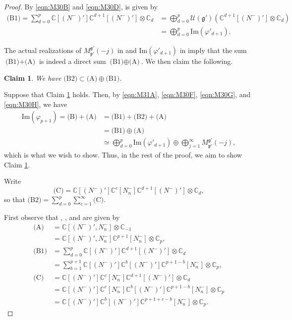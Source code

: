 \documentclass[10pt,a4paper]{amsart}
\newtheorem{claim}{Claim}
\newcommand{\C}{\mathbb{C}}
\newcommand{\Cal}{\mathcal}
\renewcommand{\Im}{\mathrm{Im}}
\newcommand{\Mpp}{M^{\fg'}_{\fp'}}
\newcommand{\Nn}{N_n^-}
\newcommand{\Np}{(N^-)'}
\newcommand{\fg}{{\mathfrak g}}
\newcommand{\fp}{{\mathfrak p}}
\begin{document}
\begin{proof}
\noindent
By \eqref{eqn:M30B} and \eqref{eqn:M30D},   is given by
\begin{align}
\text{(B1)}
=\sum_{d=0}^p\C[\Np]\C^{d+1}[\Np]\otimes \C_d
&=\bigoplus_{d=0}^p\Cal{U}(\fg')\left(\C^{d+1}[\Np]\otimes \C_d\right)\nonumber \\
&=\bigoplus_{d=0}^p \Im(\varphi'_{d+1}).\label{eqn:M30H}
\end{align}

The actual realizations of $\Mpp(-j)$ in  and $\Im(\varphi'_{d+1})$ in 
imply that 
the sum $\text{(B1)} + \text{(A)}$ is indeed a direct sum
$\text{(B1)} \oplus \text{(A)}$.
We then claim the following.

\begin{claim}\label{claim:M30}
We have $\text{(B2)} \subset \text{(A)} \oplus \text{(B1)}$.
\end{claim}

Suppose that Claim \ref{claim:M30} holds. Then, 
by \eqref{eqn:M31A}, \eqref{eqn:M30F}, \eqref{eqn:M30G}, and \eqref{eqn:M30H},
we have 
\begin{align*}
\Im(\varphi_{p+1}) 
= \text{(B)}+\text{(A)}
&=\text{(B1)} + \text{(B2)} + \text{(A)}\\
&= \text{(B1)}\oplus \text{(A)}\\
&\simeq 
\bigoplus_{d=0}^p \Im(\varphi'_{d+1}) \oplus \bigoplus_{j=1}^\infty\Mpp(-j),
\end{align*}
which is what we wish to show. Thus, in the rest of the proof, we aim to show 
Claim \ref{claim:M30}.

Write
\begin{equation*}
\text{(C)}=\C[\Np]\C^c[\Nn]\C^{d+1}[\Np]\otimes \C_d,
\end{equation*}
so that 
$\text{(B2)} = \sum_{d=0}^p\sum_{c=1}^\infty \text{(C)}$.

First observe that , , and  are given by
\begin{align*}
\text{(A)}
&= \C[\Np,\Nn]\otimes \C_{-1}\\
&=\C[\Np,\Nn]\C^{p+1}[\Nn]\otimes \C_p,\\[7pt]
\text{(B1)}
&=\sum_{d=0}^p\C[\Np]\C^{d+1}[\Np]\otimes \C_d\\
&=\sum_{b=1}^{p+1}\C[\Np]\C^{b}[\Np]\C^{p+1-b}[\Nn]\otimes \C_p, \\[7pt]
\text{(C)}
&= \C[\Np]\C^c[\Nn]\C^{d+1}[\Np]\otimes \C_d\\
&= \C[\Np]\C^c[\Nn]\C^{b}[\Np]\C^{p+1-b}[\Nn]\otimes \C_p\\
&= \C[\Np]\C^{b}[\Np]\C^{p+1+c-b}[\Nn]\otimes \C_p.
\end{align*}


\end{proof}
\end{document}
